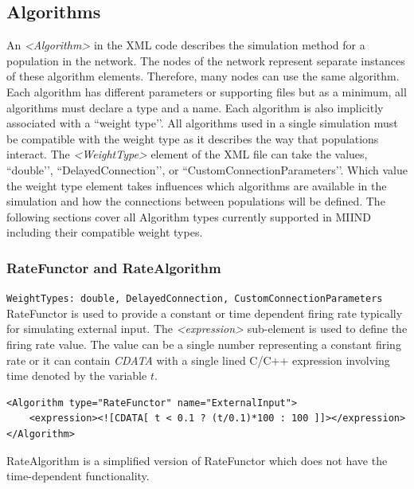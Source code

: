 \documentclass[utf8]{frontiersSCNS} %
\begin{document}
\subsection{Algorithms}

An \textit{\textless Algorithm\textgreater} in the XML code describes the simulation method for a population in the network. The nodes of the network represent separate instances of these algorithm elements. Therefore, many nodes can use the same algorithm. Each algorithm has different parameters or supporting files but as a minimum, all algorithms must declare a type and a name. Each algorithm is also implicitly associated with a ``weight type’’. All algorithms used in a single simulation must be compatible with the weight type as it describes the way that populations interact. The \textit{\textless WeightType\textgreater} element of the XML file can take the values, ``double’’, ``DelayedConnection’’, or ``CustomConnectionParameters’’. Which value the weight type element takes influences which algorithms are available in the simulation and how the connections between populations will be defined. The following sections cover all Algorithm types currently supported in MIIND including their compatible weight types.\\

\subsubsection{RateFunctor and RateAlgorithm}
\texttt{WeightTypes: double, DelayedConnection, CustomConnectionParameters}\\

RateFunctor is used to provide a constant or time dependent firing rate typically for simulating external input. The \textit{\textless expression\textgreater} sub-element is used to define the firing rate value. The value can be a single number representing a constant firing rate or it can contain \textit{CDATA} with a single lined C/C++ expression involving time denoted by the variable $t$.

\begin{lstlisting}[caption={A RateFunctor algorithm definition in which the firing rate linearly increases to 100Hz over 0.1 seconds and remains at 100Hz thereafter.}]
<Algorithm type="RateFunctor" name="ExternalInput">
	<expression><![CDATA[ t < 0.1 ? (t/0.1)*100 : 100 ]]></expression>
</Algorithm>
\end{lstlisting}

RateAlgorithm is a simplified version of RateFunctor which does not have the time-dependent functionality.
\end{document}
